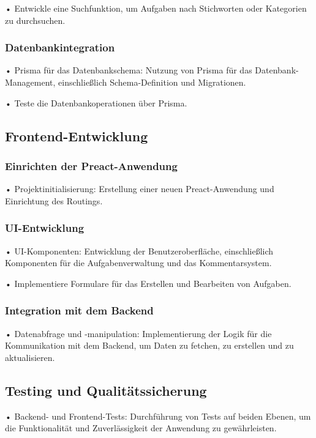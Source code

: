 \documentclass[12pt,a4paper]{article} %
\begin{document}
•	Entwickle eine Suchfunktion, um Aufgaben nach Stichworten oder Kategorien zu durchsuchen.

\subsubsection*{Datenbankintegration}

•	Prisma für das Datenbankschema: Nutzung von Prisma für das Datenbank-Management, einschließlich Schema-Definition und Migrationen.

•	Teste die Datenbankoperationen über Prisma.

\subsection{Frontend-Entwicklung}

\subsubsection*{Einrichten der Preact-Anwendung}

•	Projektinitialisierung: Erstellung einer neuen Preact-Anwendung und Einrichtung des Routings.

\subsubsection*{UI-Entwicklung}

•	UI-Komponenten: Entwicklung der Benutzeroberfläche, einschließlich Komponenten für die Aufgabenverwaltung und das Kommentarsystem.

•	Implementiere Formulare für das Erstellen und Bearbeiten von Aufgaben.

\subsubsection*{Integration mit dem Backend}

•	Datenabfrage und -manipulation: Implementierung der Logik für die Kommunikation mit dem Backend, um Daten zu fetchen, zu erstellen und zu aktualisieren.

\subsection{Testing und Qualitätssicherung}

•	Backend- und Frontend-Tests: Durchführung von Tests auf beiden Ebenen, um die Funktionalität und Zuverlässigkeit der Anwendung zu gewährleisten.
\end{document}
